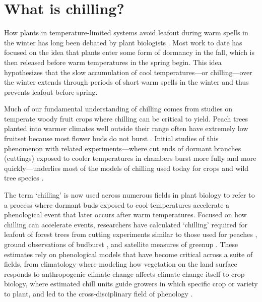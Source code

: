 \documentclass[11pt]{article}
\begin{document}
\section*{What is chilling?}

How plants in temperature-limited systems avoid leafout during warm spells in the winter has long been debated by plant biologists \citep[e.g.,][]{lamb1948effect,weinberger}. Most work to date has focused on the idea that plants enter some form of dormancy in the fall, which is then released before warm temperatures in the spring begin. This idea hypothesizes that the slow accumulation of cool temperatures---or chilling---over the winter extends through periods of short warm spells in the winter and thus prevents leafout before spring. 

Much of our fundamental understanding of chilling comes from studies on temperate woody fruit crops where chilling can be critical to yield. Peach trees planted into warmer climates well outside their range often have extremely low fruitset because most flower buds do not burst \citep{weinberger,overcash1955effects,erez1971improved}. Initial studies of this phenomenon with related experiments---where cut ends of dormant branches (cuttings) exposed to cooler temperatures in chambers burst more fully and more quickly---underlies most of the models of chilling used today for crops and wild tree species \citep[][]{weinberger,ospreebbms}. %

The term `chilling' is now used across numerous fields in plant biology to refer to a process where dormant buds exposed to cool temperatures accelerate a phenological event that later occurs after warm temperatures. Focused on how chilling can accelerate events, researchers have calculated `chilling' required for leafout of forest trees from cutting experiments similar to those used for peaches \citep[reviewed in][]{ospreebbms}, ground observations of budburst \citep{Luedeling2009}, and satellite measures of greenup \citep{kaduk2011predicting}. These estimates rely on phenological models that have become critical across a suite of fields, from climatology where modeling how vegetation on the land surface responds to anthropogenic climate change affects climate change itself to crop biology, where estimated chill units guide growers in which specific crop or variety to plant, and led to the cross-disciplinary field of phenology \citep{Schwartz:1994he,Cleland:2007or,pmp}. %
\end{document}
